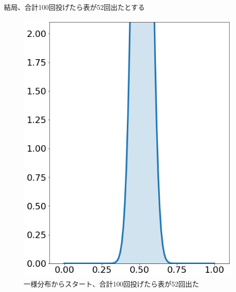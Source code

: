 \documentclass[aspectratio=169,unicode,dvipdfmx,14pt]{beamer}
\begin{document}
\begin{frame}{結局、合計100回投げたら表が52回出たとする}
\begin{figure}[htbp]
\begin{center}
\includegraphics[scale=0.3]{beta_53_49.png}
\caption{一様分布からスタート、合計100回投げたら表が52回出た}
\label{}
\end{center}
\end{figure}
\end{frame}
\end{document}
